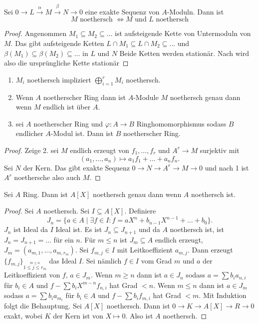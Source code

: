 \begin{Satz}
    Sei \(0\to L\stackrel{\alpha}\to M\stackrel \beta\to N\to 0\) eine exakte Sequenz von \(A\)-Moduln. Dann ist \[M \text{ noethersch } \iff M \text{ und } L \text{ noethersch}\]
\end{Satz}
\begin{proof}
    Angenommen \(M_1\subseteq M_2\subseteq \dots\) ist aufsteigende Kette von Untermoduln von \(M\). Das gibt aufsteigende Ketten
    \(L\cap M_1\subseteq L\cap M_2\subseteq \dots\) und
    \(\beta(M_1)\subseteq \beta(M_2)\subseteq \dots\) in \(L\) und \(N\) Beide Ketten werden stationär. Nach  wird also die ursprüngliche Kette stationär
\end{proof}
\begin{Kor}
    \begin{enumerate}
        \item \(M_i\) noethersch impliziert \(\bigoplus_{i=1}^rM_i\) noethersch.
        \item Wenn \(A\) noetherscher Ring dann ist \(A\)-Module \(M\) noethersch genau dann wenn \(M\) endlich ist über \(A\).
        \item sei \(A\) noetherscher Ring und \(\varphi\colon A\to B\) Ringhomomorphismus sodass \(B\) endlicher \(A\)-Modul ist. Dann ist \(B\) noetherscher Ring.
    \end{enumerate}
\end{Kor}
\begin{proof}
    Zeige 2. sei \(M\) endlich erzeugt von \(f_1,\dots,f_r\) und \(A^r\to M\) surjektiv mit \[(a_1,\dots,a_n)\mapsto a_1f_1+\dots+a_nf_n.\] Sei \(N\) der Kern. Das gibt exakte Sequenz 
    \(0\to N\to A^r\to M\to 0\) und nach 1 ist \(A^r\) noethersche also auch \(M\).
\end{proof}
\begin{Satz} Sei \(A\) Ring.  Dann ist \(A[X]\) noethersch genau dann wenn \(A\) noethersch ist.
\end{Satz}
\begin{proof}
    Sei \(A\) noethersch.
    Sei \(I\subseteq A[X]\). Definiere \[J_n=\{a\in A\mid \exists f\in I\colon f=aX^n+b_{n-1}X^{n-1}+\dots+b_0\}.\] \(J_n\) ist Ideal da \(I\) Ideal ist. Es ist \(J_n\subseteq J_{n+1}\) und da \(A\) noethersch ist, ist \(J_n=J_{n+1}=\dots\) für ein \(n\).
    Für \(m\leq n\) ist \(J_m\subseteq A\) endlich erzeugt, \(J_m=(a_{m,1},\dots,a_{m,r_m})\). Sei \(f_{m,j}\in I\) mit Leitkoeffizient \(a_{m,j}\). Dann erzeugt \(\{f_{m,j}\}_{\stackrel{m\leq n}{1\leq j\leq r_m}}\) das Ideal \(I\). Sei nämlich \(f\in I\) vom Grad \(m\) und \(a\) der Leitkoeffizient von \(f\), \(a\in J_m\).
    Wenn \(m\geq n\) dann ist \(a\in J_n\) sodass \(a=\sum b_ia_{n,i}\) für \(b_i\in A\) und \(f-\sum b_iX^{m-n}f_{n,i}\) hat Grad \(<n\).
    Wenn \(m\leq n\) dann ist \(a\in J_m\) sodass \(a=\sum b_ia_{m_i}\) für \(b_i\in A\) und \(f-\sum b_if_{m,i}\) hat Grad \(<m\). Mit Induktion folgt die Behauptung.
    Sei \(A[X]\) noethersch. Dann ist \(0\to K\to A[X]\to R\to 0\) exakt, wobei \(K\) der Kern ist von \(X\mapsto 0\). Also ist \(A\) noethersch.
\end{proof}
